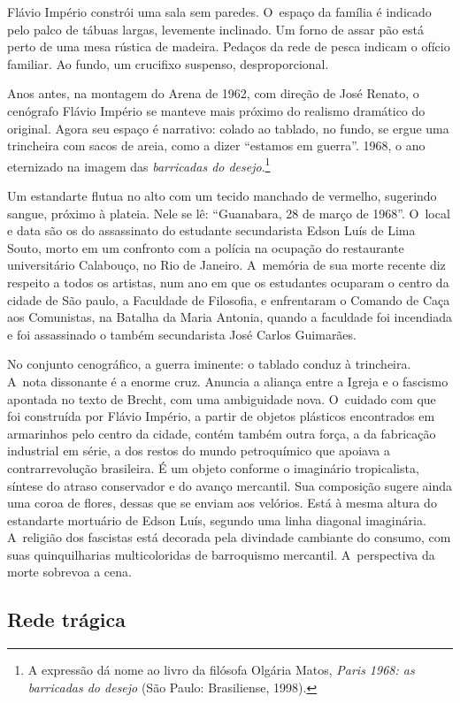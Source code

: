 Flávio Império constrói uma sala sem paredes. O~espaço da família é
indicado pelo palco de tábuas largas, levemente inclinado. Um forno de
assar pão está perto de uma mesa rústica de madeira. Pedaços da rede de
pesca indicam o ofício familiar. Ao fundo, um crucifixo suspenso,
desproporcional.

Anos antes, na montagem do Arena de 1962, com direção de José Renato, o
cenógrafo Flávio Império se manteve mais próximo do realismo dramático
do original. Agora seu espaço é narrativo: colado ao tablado, no fundo,
se ergue uma trincheira com sacos de areia, como a dizer “estamos em
guerra”. 1968, o ano eternizado na imagem das {\it barricadas do
desejo}.\footnote{A expressão dá nome ao livro da filósofa Olgária Matos,
  {\it Paris 1968: as barricadas do desejo} (São Paulo: Brasiliense,
  1998).}

Um estandarte flutua no alto com um tecido manchado de vermelho,
sugerindo sangue, próximo à plateia. Nele se lê: “Guanabara, 28 de março
de 1968”. O~local e data são os do assassinato do estudante
secundarista Edson Luís de Lima Souto, morto em um confronto com a
polícia na ocupação do restaurante universitário Calabouço, no Rio de
Janeiro. A~memória de sua morte recente diz respeito a todos os
artistas, num ano em que os estudantes ocuparam o centro da cidade de
São paulo, a Faculdade de Filosofia, e enfrentaram o Comando de Caça aos
Comunistas, na Batalha da Maria Antonia, quando a faculdade foi
incendiada e foi assassinado o também secundarista José Carlos
Guimarães.

No conjunto cenográfico, a guerra iminente: o tablado conduz à
trincheira. A~nota dissonante é a enorme cruz. Anuncia a aliança entre a
Igreja e o fascismo apontada no texto de Brecht, com uma ambiguidade
nova. O~cuidado com que foi construída por Flávio Império, a partir de
objetos plásticos encontrados em armarinhos pelo centro da cidade,
contém também outra força, a da fabricação industrial em série, a dos
restos do mundo petroquímico que apoiava a contrarrevolução brasileira.
É um objeto conforme o imaginário tropicalista, síntese do atraso
conservador e do avanço mercantil. Sua composição sugere ainda uma coroa
de flores, dessas que se enviam aos velórios. Está à mesma altura do
estandarte mortuário de Edson Luís, segundo uma linha diagonal
imaginária. A~religião dos fascistas está decorada pela divindade
cambiante do consumo, com suas quinquilharias multicoloridas de
barroquismo mercantil. A~perspectiva da morte sobrevoa a cena.

\subsection{Rede trágica}

